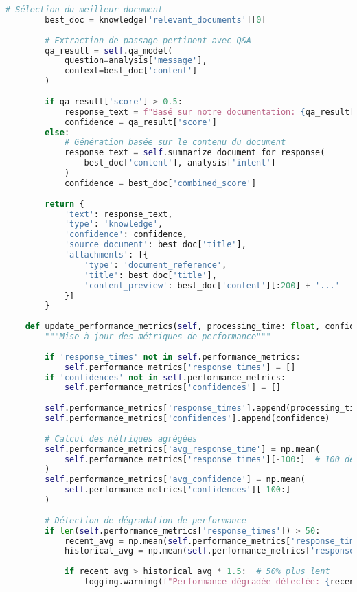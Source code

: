 \documentclass[12pt,a4paper]{report}
\begin{document}
\begin{lstlisting}[language=Python, caption=Pipeline NLP avancé pour le chatbot]
        # Sélection du meilleur document
        best_doc = knowledge['relevant_documents'][0]
        
        # Extraction de passage pertinent avec Q&A
        qa_result = self.qa_model(
            question=analysis['message'],
            context=best_doc['content']
        )
        
        if qa_result['score'] > 0.5:
            response_text = f"Basé sur notre documentation: {qa_result['answer']}"
            confidence = qa_result['score']
        else:
            # Génération basée sur le contenu du document
            response_text = self.summarize_document_for_response(
                best_doc['content'], analysis['intent']
            )
            confidence = best_doc['combined_score']
        
        return {
            'text': response_text,
            'type': 'knowledge',
            'confidence': confidence,
            'source_document': best_doc['title'],
            'attachments': [{
                'type': 'document_reference',
                'title': best_doc['title'],
                'content_preview': best_doc['content'][:200] + '...'
            }]
        }
    
    def update_performance_metrics(self, processing_time: float, confidence: float):
        """Mise à jour des métriques de performance"""
        
        if 'response_times' not in self.performance_metrics:
            self.performance_metrics['response_times'] = []
        if 'confidences' not in self.performance_metrics:
            self.performance_metrics['confidences'] = []
        
        self.performance_metrics['response_times'].append(processing_time)
        self.performance_metrics['confidences'].append(confidence)
        
        # Calcul des métriques agrégées
        self.performance_metrics['avg_response_time'] = np.mean(
            self.performance_metrics['response_times'][-100:]  # 100 dernières
        )
        self.performance_metrics['avg_confidence'] = np.mean(
            self.performance_metrics['confidences'][-100:]
        )
        
        # Détection de dégradation de performance
        if len(self.performance_metrics['response_times']) > 50:
            recent_avg = np.mean(self.performance_metrics['response_times'][-10:])
            historical_avg = np.mean(self.performance_metrics['response_times'][-50:-10])
            
            if recent_avg > historical_avg * 1.5:  # 50% plus lent
                logging.warning(f"Performance dégradée détectée: {recent_avg:.2f}s vs {historical_avg:.2f}s")
\end{lstlisting}
\end{document}
